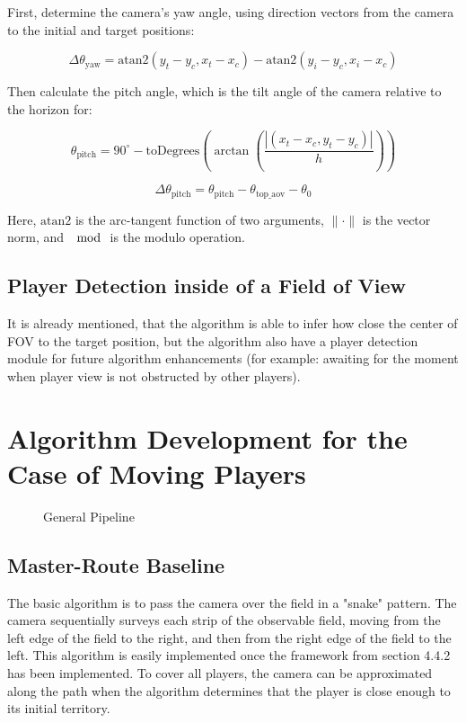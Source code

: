    First, determine the camera's yaw angle, using direction vectors from the camera to the initial and target positions:

    $$
   \Delta \theta_{\text{yaw}} = \text{atan2}(y_t - y_c, x_t - x_c) - \text{atan2}(y_i - y_c, x_i - x_c)
    $$

   Then calculate the pitch angle, which is the tilt angle of the camera relative to the horizon for:

    $$
   \theta_{\text{pitch}} = 90^\circ - \text{toDegrees}(\arctan( \frac{|(x_t-x_c, y_t-y_c) | }{h}) )
    $$

    $$
   \Delta \theta_{\text{pitch}} = \theta_{\text{pitch}} - \theta_{\text{top\_aov}} - \theta_{0}
    $$

Here, $ \text{atan2}  $ is the arc-tangent function of two arguments, $ \| \cdot \|  $ is the vector norm, and $\mod$ is the modulo operation.

\subsection{Player Detection inside of a Field of View}
It is already mentioned, that the algorithm is able to infer how close the center of FOV to the target position, but the algorithm also have a player detection module for future algorithm enhancements (for example: awaiting for the moment when player view is not obstructed by other players). 




\section{Algorithm Development for the Case of Moving Players}

\begin{figure}[!ht]
    \centering
    
    \caption{General Pipeline}
    \label{fig:hist_results}
\end{figure}



\subsection{Master-Route Baseline}
The basic algorithm is to pass the camera over the field in a "snake" pattern. The camera sequentially surveys each strip of the observable field, moving from the left edge of the field to the right, and then from the right edge of the field to the left. This algorithm is easily implemented once the framework from section 4.4.2 has been implemented. To cover all players, the camera can be approximated along the path when the algorithm determines that the player is close enough to its initial territory.



